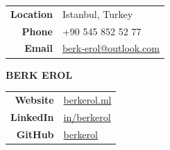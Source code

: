 \documentclass[a4paper, 10pt]{article}
\begin{document}
{\setlength{\tabcolsep}{0.1cm}
\begin{tabular}{r l}
	\textbf{Location} & Istanbul, Turkey\\
	\textbf{Phone} & +90 545 852 52 77\\
	\textbf{Email} & \href{mailto:berk-erol@outlook.com}{berk-erol@outlook.com}
\end{tabular}
\hspace{1.4cm} {\Huge \textbf{BERK EROL}} \hspace{2.5cm}
\begin{tabular}{r l}
	\textbf{Website} & \href{https://berkerol.ml}{berkerol.ml}\\
	\textbf{LinkedIn} & \href{https://www.linkedin.com/in/berkerol}{in/berkerol}\\
	\textbf{GitHub} & \href{https://github.com/berkerol}{berkerol}
\end{tabular}}
\end{document}
